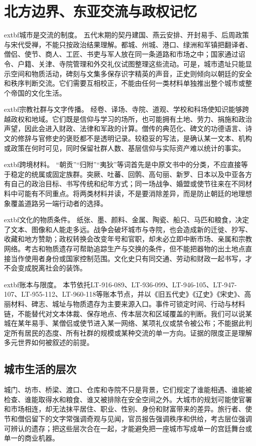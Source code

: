 \section{北方边界、东亚交流与政权记忆}
\label{sec:east-asian-exchange-memory}

\noindent	extbf{城市是交流的制度。} 五代末期的契丹建国、燕云安排、开封易手、后周政策与宋代受禅，不能只按政治结果理解。都城、州城、港口、绿洲和军镇把翻译者、僧侣、使节、商人、工匠、书吏与军人放在同一条道路和市场之中；国家通过诏令、户籍、关津、寺院管理和外交礼仪试图整理这些流动。可是，城市遗址只能显示空间和物质活动，碑刻与文集多保存识字精英的声音，正史则倾向以朝廷的安全和秩序判断交流。它们需要互相校正，不能由任何一类材料单独推出整个城市或整个帝国的文化生活。

\noindent	extbf{宗教社群与文字传播。} 经卷、译场、寺院、道观、学校和科场使知识能够跨越政权和地域。它们既是信仰与学习的场所，也可能拥有土地、劳力、捐施和政治声望，因此会进入财政、法律和军政的计算。僧传的典范化、碑文的功德语言、诗文的修辞与官修史的褒贬都不是透明记录。较稳妥的写法，是确认某一文本、机构或政策在何时可见，同时保留社群人数、基层信仰与实际资产难以统计的事实。

\noindent	extbf{跨境材料。} “朝贡”“归附”“夷狄”等词首先是中原文书中的分类，不应直接等于稳定的统属或固定族群。突厥、吐蕃、回鹘、高句丽、新罗、日本以及中亚各方有自己的政治目标、书写传统和纪年方式；同一场战争、婚盟或使节往来在不同材料中可能有不同重点。将两类材料并读，不是要消除差异，而是防止朝廷的地理想象覆盖道路另一端行动者的选择。

\noindent	extbf{文化的物质条件。} 纸张、墨、颜料、金属、陶瓷、船只、马匹和粮食，决定了文本、图像和人能走多远。战争会破坏城市与寺院，也会造成新的迁徙、抄写、收藏和地方赞助；政权转换会改变年号和官职，却未必立即中断市场、亲属和宗教网络。考古和物质遗存可帮助追踪生产与交换的条件，但不能把器物的出土地点直接当作使用者身份或国家控制范围。文化史只有同交通、劳动和财政一起书写，才不会变成脱离社会的装饰。

\noindent	extbf{账本与限度。} 本节依托LT-916-089、LT-936-099、LT-946-105、LT-947-107、LT-955-112、LT-960-118等账本节点，并以《旧五代史》《辽史》《宋史》、高丽材料、碑志、城址与物质遗存为主要来源入口。事件可锁定时间、行动与材料链，不能替代对文本体裁、保存地点、传本层次和区域覆盖的判断。我们可以说某城在某年易手、某僧侣或使节进入某一网络、某项礼仪或禁令被公布；不能据此判定所有居民的态度、所有社群的规模或某种交流的单一方向。证据的限度正是理解多元世界如何被叙述的前提。

\subsection{城市生活的层次}
城门、坊市、桥梁、渡口、仓库和寺院不只是背景，它们规定了谁能相遇、谁能被检查、谁能取得水和粮食、谁又被排除在安全空间之外。大城市的规划可能使官署和市场相连，却无法抹平居住、职业、性别、身份和财富带来的差异。旅行者、使节和僧侣留下的文字常强调奇观与见闻，官员报告强调秩序和供给，考古层位强调可辨认的遗存；把这些层次合在一起，才能避免把一座城市写成单一的宫廷舞台或单一的商业机器。

